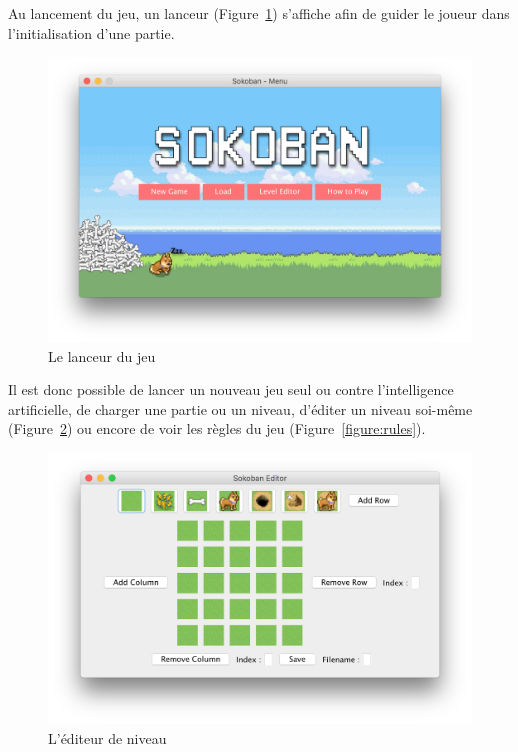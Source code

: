 \documentclass[a4paper, 11pt]{report}
\begin{document}
Au lancement du jeu, un lanceur (Figure~\ref{figure:lanceur}) s'affiche afin de guider le joueur dans l'initialisation d'une partie.

\begin{figure}[h!]
\centering
\includegraphics[width=\textwidth]{images/launcher.png}%
\caption{Le lanceur du jeu}
\label{figure:lanceur}
\end{figure}

Il est donc possible de lancer un nouveau jeu seul ou contre l'intelligence artificielle, de charger une partie ou un niveau, d'éditer un niveau soi-même (Figure~\ref{figure:editor}) ou encore de voir les règles du jeu (Figure~\ref{figure:rules}).

\begin{figure}[h!]
\centering
\includegraphics[width=\textwidth]{images/editor.png}%
\caption{L'éditeur de niveau}
\label{figure:editor}
\end{figure}
\end{document}
